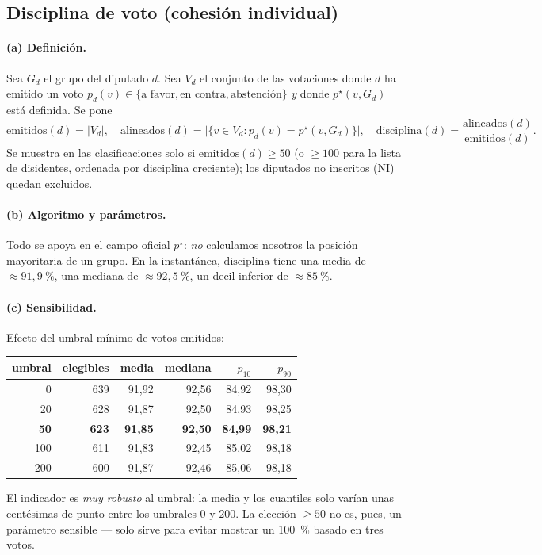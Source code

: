 \subsection{Disciplina de voto (cohesión individual)}\label{sec:discipline-es}

\paragraph{(a) Definición.} Sea $G_d$ el grupo del diputado $d$. Sea $V_d$ el
conjunto de las votaciones donde $d$ ha emitido un voto $p_d(v)\in\{\text{a favor},\text{en contra},\text{abstención}\}$
\emph{y} donde $p^\star(v,G_d)$ está definida. Se pone
\[
\mathrm{emitidos}(d)=|V_d|,\quad
\mathrm{alineados}(d)=\big|\{v\in V_d : p_d(v)=p^\star(v,G_d)\}\big|,\quad
\mathrm{disciplina}(d)=\frac{\mathrm{alineados}(d)}{\mathrm{emitidos}(d)}.
\]
Se muestra en las clasificaciones solo si $\mathrm{emitidos}(d)\ge 50$ (o $\ge 100$
para la lista de \og{}disidentes\fg{}, ordenada por disciplina creciente); los
diputados no inscritos (NI) quedan excluidos.

\paragraph{(b) Algoritmo y parámetros.} Todo se apoya en el campo oficial
$p^\star$: \emph{no} calculamos nosotros la posición mayoritaria de un grupo. En la
instantánea, $\mathrm{disciplina}$ tiene una media de $\approx 91{,}9~\%$, una
mediana de $\approx 92{,}5~\%$, un decil inferior de $\approx 85~\%$.

\paragraph{(c) Sensibilidad.} Efecto del umbral mínimo de votos emitidos:
\begin{center}\small
\begin{tabular}{rrrrrr}
\toprule
umbral & elegibles & media & mediana & $p_{10}$ & $p_{90}$ \\
\midrule
0   & 639 & 91,92 & 92,56 & 84,92 & 98,30 \\
20  & 628 & 91,87 & 92,50 & 84,93 & 98,25 \\
\textbf{50}  & \textbf{623} & \textbf{91,85} & \textbf{92,50} & \textbf{84,99} & \textbf{98,21} \\
100 & 611 & 91,83 & 92,45 & 85,02 & 98,18 \\
200 & 600 & 91,87 & 92,46 & 85,06 & 98,18 \\
\bottomrule
\end{tabular}
\end{center}
El indicador es \emph{muy robusto} al umbral: la media y los cuantiles solo varían
unas centésimas de punto entre los umbrales $0$ y $200$. La elección $\ge 50$ no es,
pues, un parámetro sensible — solo sirve para evitar mostrar un \og{}100~\%\fg{}
basado en tres votos.

